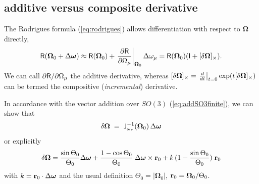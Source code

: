 \documentclass[conference]{IEEEtran}
\newcommand{\bfomega}{\boldsymbol{\omega}}
\newcommand{\bfOmega}{\boldsymbol{\Omega}}
\newcommand{\beq}{\begin{equation}}
\newcommand{\eeq}{\end{equation}}
\begin{document}
\begin{appendix}
\subsection{additive versus composite derivative}
\label{app:incremental}
The Rodrigues formula (\ref{eq:rodrigues}) allows differentiation with respect to $\bfOmega$ directly,
\beq
    {\sf R}(\bfOmega_0+\Delta\bfomega) \approx 
    {\sf R}(\bfOmega_0) + \left. {\partial{\sf R}\over \partial\Omega_\mu} \right|_{\bfOmega_0}
    \Delta\omega_\mu = {\sf R}(\bfOmega_0) ( {\sf I} + [\delta\bfOmega]_\times ).
    \label{eq:rodriguesder}
\eeq
We can call $\partial{\sf R}/ \partial\Omega_\mu$ the additive derivative, whereas 
$[\delta\bfOmega]_\times = \left.{d\over dt}\right|_{t=0} \exp( t [\delta\bfOmega]_\times )$
can be termed the compositive ({\em incremental}) derivative.

In accordance with the vector addition over $SO(3)$ (\ref{eq:addSO3finite}), we can show that
\beq
     \delta\bfOmega \; = \; {\sf J}^{-1}_{\omega_r}(\bfOmega_0)\, \Delta\bfomega
    \label{eq:SO3localglobal}
\eeq
or explicitly
\beq
    \delta{\bfOmega}=
    {\sin\Theta_0\over\Theta_0} \Delta\bfomega + {1-\cos\Theta_0\over\Theta_0}\; \Delta\bfomega\times{\bf r}_0 +
    k\,(1-{\sin\Theta_0\over\Theta_0}) \; {\bf r}_0
    \nonumber
\eeq
with $k={\bf r}_0\cdot\Delta\bfomega$ and the usual definition $\Theta_0=|\bfOmega_0|$,
${\bf r}_0 = \bfOmega_0/\Theta_0$.


\end{appendix}
\end{document}
